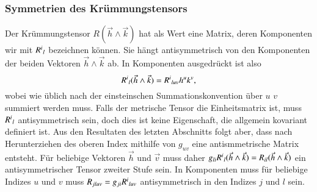 %
%
\subsubsection{Symmetrien des Krümmungstensors}
Der Krümmungstensor $R(\vec{h}\wedge\vec{k})$ hat als Wert eine Matrix,
deren Komponenten wir mit $R^i\mathstrut_l$ bezeichnen können.
Sie hängt antisymmetrisch von den Komponenten der beiden Vektoren
$\vec{h}\wedge\vec{k}$ ab.
In Komponenten ausgedrückt ist also
\[
R^i\mathstrut_l(\vec{h}\wedge\vec{k})
=
R^i\mathstrut_{luv} h^uk^v,
\]
wobei wie üblich nach der einsteinschen Summationskonvention über $u$
$v$ summiert werden muss.
Falls der metrische Tensor die Einheitsmatrix ist, muss $R^i\mathstrut_l$
antisymmetrisch sein, doch dies ist keine Eigenschaft, die allgemein
kovariant definiert ist.
Aus den Resultaten des letzten Abschnitts folgt aber, dass nach
Herunterziehen des oberen Index mithilfe von $g_{uv}$ eine
antismmetrische Matrix entsteht.
Für beliebige Vektoren $\vec{h}$ und $\vec{v}$ muss daher
$g_{li}R^i\mathstrut_l(\vec{h}\wedge\vec{k})=R_{il}(\vec{h}\wedge\vec{k})$
ein antisymmetrischer Tensor zweiter Stufe sein.
In Komponenten muss für beliebige Indizes $u$ und $v$ muss
$R_{jluv}=g_{ji}R^i\mathstrut_{luv}$ antisymmetrisch in den
Indizes $j$ und $l$ sein.

%
%

